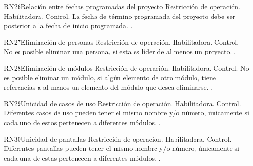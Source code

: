 \begin{BussinesRule}{RN26}{Relación entre fechas programadas del proyecto} 
	\BRitem[Tipo:] Restricción de operación. 
	\BRitem[Clase:] Habilitadora. 
	\BRitem[Nivel:] Control. %
	\BRitem[Descripción:] La fecha de término programada del proyecto debe ser posterior a la fecha de inicio programada.
	 \UCref{}{}. 
\end{BussinesRule}

\begin{BussinesRule}{RN27}{Eliminación de personas} 
	\BRitem[Tipo:] Restricción de operación. 
	\BRitem[Clase:] Habilitadora. 
	\BRitem[Nivel:] Control. %
	\BRitem[Descripción:] No es posible eliminar una persona, si esta es líder de al menos un proyecto.
	 \UCref{}{}. 
\end{BussinesRule}

\begin{BussinesRule}{RN28}{Eliminación de módulos} 
	\BRitem[Tipo:] Restricción de operación. 
	\BRitem[Clase:] Habilitadora. 
	\BRitem[Nivel:] Control. %
	\BRitem[Descripción:] No es posible eliminar un módulo, si algún elemento de otro módulo, tiene referencias a al menos un elemento del módulo que desea eliminarse.
	 \UCref{}{}. 
\end{BussinesRule}

\begin{BussinesRule}{RN29}{Unicidad de casos de uso} 
	\BRitem[Tipo:] Restricción de operación. 
	\BRitem[Clase:] Habilitadora. 
	\BRitem[Nivel:] Control. %
	\BRitem[Descripción:] Diferentes casos de uso pueden tener el mismo nombre y/o número, únicamente si cada uno de estos pertenecen a diferentes módulos.
	 \UCref{}{}. 
\end{BussinesRule}

\begin{BussinesRule}{RN30}{Unicidad de pantallas} 
	\BRitem[Tipo:] Restricción de operación. 
	\BRitem[Clase:] Habilitadora. 
	\BRitem[Nivel:] Control. %
	\BRitem[Descripción:] Diferentes pantallas pueden tener el mismo nombre y/o número, únicamente si cada una de estas pertenecen a diferentes módulos.
	 \UCref{}{}. 
\end{BussinesRule}

